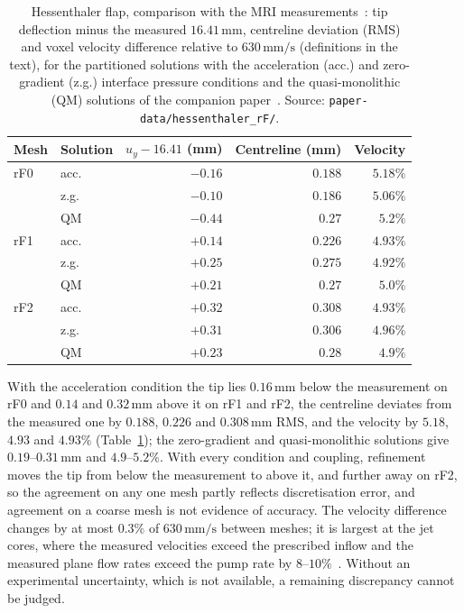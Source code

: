 \begin{table}[htbp]
	\centering
	\small
	\caption{Hessenthaler flap, comparison with the MRI measurements~\citep{Hessenthaler2017a}: tip deflection minus the measured $16.41\,\mathrm{mm}$, centreline deviation (RMS) and voxel velocity difference relative to $630\,\mathrm{mm/s}$ (definitions in the text), for the partitioned solutions with the acceleration (acc.) and zero-gradient (z.g.) interface pressure conditions and the quasi-monolithic (QM) solutions of the companion paper~\citep{CardiffBatistic2026QM}. Source: \texttt{paper-data/hessenthaler\_rF/}.}
	\label{tab:hessenthaler_validation}
	\begin{tabular}{llrrr}
		\toprule
		Mesh & Solution & $u_y - 16.41$ (mm) & Centreline (mm) & Velocity \\
		\midrule
		rF0 & acc. & $-0.16$ & $0.188$ & $5.18\%$ \\
		    & z.g. & $-0.10$ & $0.186$ & $5.06\%$ \\
		    & QM   & $-0.44$ & $0.27$  & $5.2\%$ \\
		rF1 & acc. & $+0.14$ & $0.226$ & $4.93\%$ \\
		    & z.g. & $+0.25$ & $0.275$ & $4.92\%$ \\
		    & QM   & $+0.21$ & $0.27$  & $5.0\%$ \\
		rF2 & acc. & $+0.32$ & $0.308$ & $4.93\%$ \\
		    & z.g. & $+0.31$ & $0.306$ & $4.96\%$ \\
		    & QM   & $+0.23$ & $0.28$  & $4.9\%$ \\
		\bottomrule
	\end{tabular}
\end{table}

With the acceleration condition the tip lies $0.16\,\mathrm{mm}$ below the measurement on rF0 and $0.14$ and $0.32\,\mathrm{mm}$ above it on rF1 and rF2, the centreline deviates from the measured one by $0.188$, $0.226$ and $0.308\,\mathrm{mm}$ RMS, and the velocity by $5.18$, $4.93$ and $4.93\%$ (Table~\ref{tab:hessenthaler_validation}); the zero-gradient and quasi-monolithic solutions give $0.19$--$0.31\,\mathrm{mm}$ and $4.9$--$5.2\%$.
With every condition and coupling, refinement moves the tip from below the measurement to above it, and further away on rF2, so the agreement on any one mesh partly reflects discretisation error, and agreement on a coarse mesh is not evidence of accuracy.
The velocity difference changes by at most $0.3\%$ of $630\,\mathrm{mm/s}$ between meshes; it is largest at the jet cores, where the measured velocities exceed the prescribed inflow and the measured plane flow rates exceed the pump rate by $8$--$10\%$~\citep{CardiffBatistic2026QM}.
Without an experimental uncertainty, which is not available, a remaining discrepancy cannot be judged.

